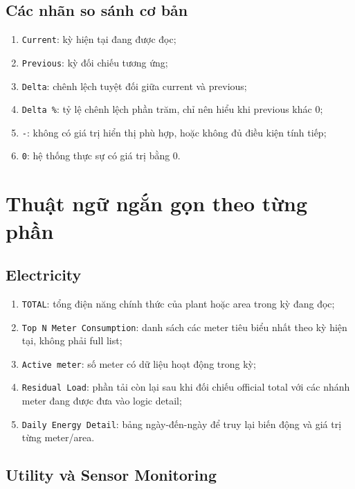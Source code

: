 \subsection{Các nhãn so sánh cơ bản}

\begin{enumerate}[label=-]
\item \texttt{Current}: kỳ hiện tại đang được đọc;
\item \texttt{Previous}: kỳ đối chiếu tương ứng;
\item \texttt{Delta}: chênh lệch tuyệt đối giữa current và previous;
\item \texttt{Delta \%}: tỷ lệ chênh lệch phần trăm, chỉ nên hiểu khi previous khác 0;
\item \texttt{-}: không có giá trị hiển thị phù hợp, hoặc không đủ điều kiện tính tiếp;
\item \texttt{0}: hệ thống thực sự có giá trị bằng 0.
\end{enumerate}

\section{Thuật ngữ ngắn gọn theo từng phần}

\subsection{Electricity}

\begin{enumerate}[label=-]
\item \texttt{TOTAL}: tổng điện năng chính thức của plant hoặc area trong kỳ đang đọc;
\item \texttt{Top N Meter Consumption}: danh sách các meter tiêu biểu nhất theo kỳ hiện tại, không phải full list;
\item \texttt{Active meter}: số meter có dữ liệu hoạt động trong kỳ;
\item \texttt{Residual Load}: phần tải còn lại sau khi đối chiếu official total với các nhánh meter đang được đưa vào logic detail;
\item \texttt{Daily Energy Detail}: bảng ngày-đến-ngày để truy lại biến động và giá trị từng meter/area.
\end{enumerate}

\subsection{Utility và Sensor Monitoring}

